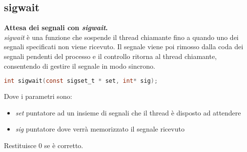 \subsection{sigwait}
\textbf{Attesa dei segnali con \textit{sigwait}.}\\
\textit{sigwait} è una funzione che sospende il thread chiamante fino a quando uno dei segnali specificati non viene ricevuto. Il segnale viene poi rimosso dalla coda dei segnali pendenti del processo e il controllo ritorna al thread chiamante, consentendo di gestire il segnale in modo sincrono.
\begin{lstlisting}[language=C]
	int sigwait(const sigset_t * set, int* sig);
\end{lstlisting}
Dove i parametri sono:
\begin{itemize}
	\item \textit{set} puntatore ad un insieme di segnali che il thread è disposto ad attendere
	\item \textit{sig} puntatore dove verrà memorizzato il segnale ricevuto
\end{itemize}
Restituisce $0$ se è corretto.
